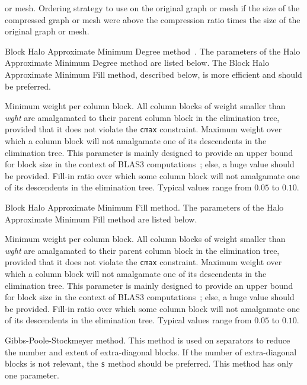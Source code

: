 \begin{itemize}
\begin{itemize}
or mesh.
\iteme[{\tt unc=}{\it strat}]
Ordering strategy to use on the original graph or mesh if the size of
the compressed graph or mesh were above the compression ratio times
the size of the original graph or mesh.
\end{itemize}
\iteme[{\tt d}]
Block Halo Approximate Minimum Degree method~\cite{peroam99}.
The parameters of the Halo Approximate Minimum Degree method are
listed below. The Block Halo Approximate Minimum Fill method,
described below, is more efficient and should be preferred.
\begin{itemize}
\iteme[{\tt cmin=}{\it wght}]
Minimum weight per column block. All column blocks of weight smaller
than {\it wght\/} are amalgamated to their parent column block in the
elimination tree, provided that it does not violate the {\tt cmax}
constraint.
\iteme[{\tt cmax=}{\it wght}]
Maximum weight over which a column block will not amalgamate one of
its descendents in the elimination tree. This parameter is mainly
designed to provide an upper bound for block size in the context of
BLAS3 computations~; else, a huge value should be provided.
\iteme[{\tt frat=}{\it rat}]
Fill-in ratio over which some column block will not amalgamate
one of its descendents in the elimination tree. Typical values
range from $0.05$ to $0.10$.
\end{itemize}
\iteme[{\tt f}]
Block Halo Approximate Minimum Fill method.
The parameters of the Halo Approximate Minimum Fill method are
listed below.
\begin{itemize}
\iteme[{\tt cmin=}{\it wght}]
Minimum weight per column block. All column blocks of weight smaller
than {\it wght\/} are amalgamated to their parent column block in the
elimination tree, provided that it does not violate the {\tt cmax}
constraint.
\iteme[{\tt cmax=}{\it size}]
Maximum weight over which a column block will not amalgamate one of
its descendents in the elimination tree. This parameter is mainly
designed to provide an upper bound for block size in the context of
BLAS3 computations~; else, a huge value should be provided.
\iteme[{\tt frat=}{\it rat}]
Fill-in ratio over which some column block will not amalgamate
one of its descendents in the elimination tree. Typical values
range from $0.05$ to $0.10$.
\end{itemize}
\iteme[{\tt g}]
Gibbs-Poole-Stockmeyer method. This method is used on separators
to reduce the number and extent of extra-diagonal blocks. If
the number of extra-diagonal blocks is not relevant, the {\tt s}
method should be preferred. This method has only one parameter.

\end{itemize}
